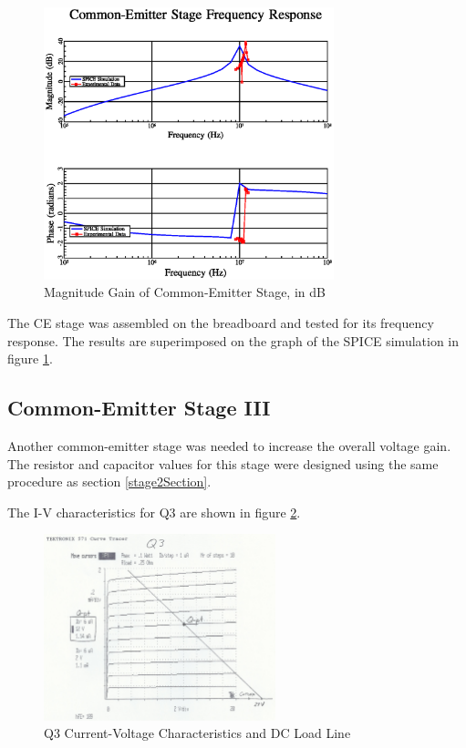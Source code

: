 \documentclass[titlepage, letterpaper, 11pt]{article}
\begin{document}
\begin{figure}[ht]
	\centering
	\includegraphics[width=0.75\textwidth]
		{mathGL/ceStage.eps}
	\caption{
		Magnitude Gain of Common-Emitter Stage, in dB
	}
	\label{CEstageMagnitudePlot}
\end{figure}

The CE stage was assembled on the breadboard and tested for its
frequency response. The results are superimposed on the graph of the
SPICE simulation in figure \ref{CEstageMagnitudePlot}.


\subsection{Common-Emitter Stage III}

Another common-emitter stage was needed to increase the overall
voltage gain. The resistor and capacitor values for this stage were
designed using the same procedure as section \ref{stage2Section}.

The I-V characteristics for Q3 are shown in figure 
\ref{q3Characteristics}.

\begin{figure}[ht]
	\centering
	\includegraphics[width=0.6\textwidth]
		{measurements/q3Characteristics}
	\caption{
		Q3 Current-Voltage Characteristics and DC Load Line
	}
	\label{q3Characteristics}
\end{figure}
\end{document}
